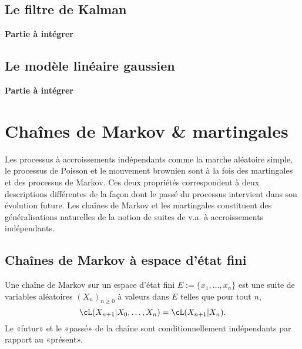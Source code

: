 %
\section{Le filtre de Kalman}
%


\textbf{Partie à intégrer}

%
\section{Le modèle linéaire gaussien}
%


\textbf{Partie à intégrer}

%
%
\chapter{Chaînes de Markov \& martingales}
\label{ch:markmart}
%
%

Les processus à accroissements indépendants comme la marche aléatoire simple,
le processus de Poisson et le mouvement brownien sont à la fois des
martingales et des processus de Markov. Ces deux propriétés correspondent à
deux descriptions différentes de la façon dont le passé du processus
intervient dans son évolution future. Les chaînes de Markov et les martingales
constituent des généralisations naturelles de la notion de suites de v.a. à
accroissements indépendants.

%
\section{Chaînes de Markov à espace d'état fini}
\label{se:chaines2marov}
% 
       
Une chaîne de Markov sur un espace d'état fini $E:=\{x_1,\ldots,x_n\}$ est une suite
de variables aléatoires $(X_n)_{n\geq 0}$ à valeurs dans $E$ telles que pour tout
$n$,
$$
\cL(X_{n+1}\vert X_0,\ldots,X_n) = \cL(X_{n+1} \vert X_n).
$$
Le «futur» et le «passé» de la chaîne sont conditionnellement
indépendants par rapport au «présent».

